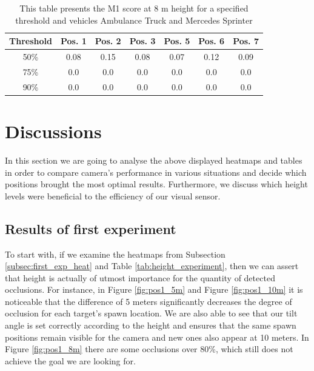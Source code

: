 \begin{table}[!htb]
\caption{This table presents the M1 score at 8 m height for a specified threshold and vehicles Ambulance Truck and Mercedes Sprinter\label{tab:amb_merc_threshold}}
\centering
    \begin{tabular}{ | c | c | c | c | c | c | c |}
    \hline
    Threshold & Pos. 1 & Pos. 2 & Pos. 3 & Pos. 5 & Pos. 6 & Pos. 7 \\ \hline
    50\% & 0.08 & 0.15 & 0.08 & 0.07 & 0.12 & 0.09\\ \hline
    75\% & 0.0 & 0.0 & 0.0 & 0.0 & 0.0 & 0.0\\ \hline
    90\% & 0.0 & 0.0 & 0.0 & 0.0 & 0.0 & 0.0\\ \hline
    \end{tabular}
\end{table}

\newpage
\section{Discussions}\label{discussions}
In this section we are going to analyse the above displayed heatmaps and tables in order to compare camera's performance in various situations and decide which positions brought the most optimal results. Furthermore, we discuss which height levels were beneficial to the efficiency of our visual sensor.

\subsection{Results of first experiment}
To start with, if we examine the heatmaps from Subsection \ref{subsec:first_exp_heat} and Table \ref{tab:height_experiment}, then we can assert that height is actually of utmost importance for the quantity of detected occlusions. For instance, in Figure \ref{fig:pos1_5m} and Figure \ref{fig:pos1_10m} it is noticeable that the difference of 5 meters significantly decreases the degree of occlusion for each target's spawn location. We are also able to see that our tilt angle is set correctly according to the height and ensures that the same spawn positions remain visible for the camera and new ones also appear at 10 meters. In Figure \ref{fig:pos1_8m} there are some occlusions over 80\%, which still does not achieve the goal we are looking for. 

